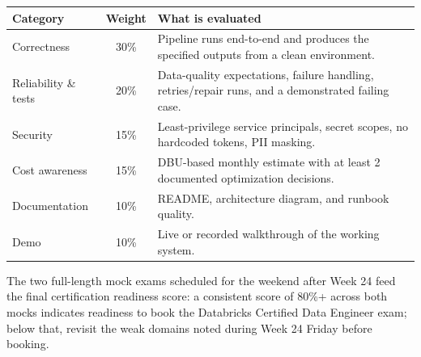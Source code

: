 \documentclass[11pt, a4paper]{article}
\begin{document}
\begin{center}
\renewcommand{\arraystretch}{1.3}
\begin{tabular}{@{} l c p{7.5cm} @{}}
\toprule
\textbf{Category} & \textbf{Weight} & \textbf{What is evaluated} \\
\midrule
Correctness & 30\% & Pipeline runs end-to-end and produces the specified outputs from a clean environment. \\
Reliability \& tests & 20\% & Data-quality expectations, failure handling, retries/repair runs, and a demonstrated failing case. \\
Security & 15\% & Least-privilege service principals, secret scopes, no hardcoded tokens, PII masking. \\
Cost awareness & 15\% & DBU-based monthly estimate with at least 2 documented optimization decisions. \\
Documentation & 10\% & README, architecture diagram, and runbook quality. \\
Demo & 10\% & Live or recorded walkthrough of the working system. \\
\bottomrule
\end{tabular}
\end{center}

The two full-length mock exams scheduled for the weekend after Week 24 feed the final certification readiness score: a consistent score of 80\%+ across both mocks indicates readiness to book the Databricks Certified Data Engineer exam; below that, revisit the weak domains noted during Week 24 Friday before booking.
\end{document}
